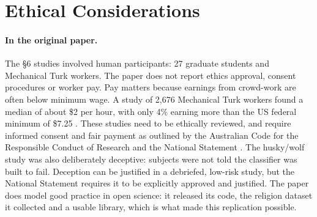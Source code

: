 \documentclass[11pt]{article}
\begin{document}
\section{Ethical Considerations}
\label{sec:ethics}

\paragraph{In the original paper.} The \S6 studies involved human participants: 27 graduate students and Mechanical Turk workers. The paper does not report ethics approval, consent procedures or worker pay. Pay matters because earnings from crowd-work are often below minimum wage. A study of 2,676 Mechanical Turk workers found a median of about \$2 per hour, with only 4\% earning more than the US federal minimum of \$7.25 \citep{hara2018data}. These studies need to be ethically reviewed, and require informed consent and fair payment as outlined by the Australian Code for the Responsible Conduct of Research \citep{nhmrc2018code} and the National Statement \citep{nhmrc2023national}. The husky/wolf study was also deliberately deceptive: subjects were not told the classifier was built to fail. Deception can be justified in a debriefed, low-risk study, but the National Statement requires it to be explicitly approved and justified. The paper does model good practice in open science: it released its code, the religion dataset it collected and a usable library, which is what made this replication possible.
\end{document}
